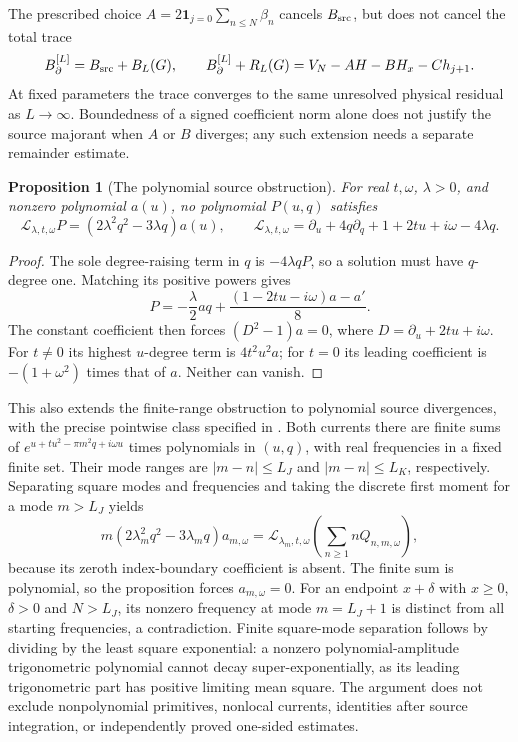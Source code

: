 \documentclass[11pt]{article}
\numberwithin{equation}{section}
\newtheorem{proposition}[theorem]{Proposition}
\theoremstyle{definition}
\theoremstyle{remark}
\begin{document}
The prescribed choice
$A=2\mathbf1_{j=0}\sum_{n\le N}\beta_n$ cancels $B_{\rm src}$,
but does not cancel the total trace
\begin{equation}
 B_\partial^{[L]}=B_{\rm src}+B_L(G),\qquad
 B_\partial^{[L]}+R_L(G)=V_N-AH-BH_x-Ch_{j+1}.
 \label{adj:joint-total-residual}
\end{equation}
At fixed parameters the trace converges to the same unresolved physical
residual as $L\to\infty$. Boundedness of a signed coefficient norm
alone does not justify the source majorant when $A$ or $B$ diverges;
any such extension needs a separate remainder estimate.

\begin{proposition}[The polynomial source obstruction]
\label{adj:polynomial-source-obstruction}
For real $t,\omega$, $\lambda>0$, and nonzero polynomial $a(u)$,
no polynomial $P(u,q)$ satisfies
\begin{equation}
 \mathcal L_{\lambda,t,\omega}P
 =(2\lambda^2q^2-3\lambda q)a(u),\qquad
 \mathcal L_{\lambda,t,\omega}
 =\partial_u+4q\partial_q+1+2tu+i\omega-4\lambda q.
 \label{adj:polynomial-source-equation}
\end{equation}
\end{proposition}
\begin{proof}
The sole degree-raising term in $q$ is $-4\lambda qP$, so a
solution must have $q$-degree one. Matching its positive powers gives
\[
 P=-\frac\lambda2a q+\frac{(1-2tu-i\omega)a-a'}8.
\]
The constant coefficient then forces $(D^2-1)a=0$, where
$D=\partial_u+2tu+i\omega$.
For $t\ne0$ its highest $u$-degree term is $4t^2u^2a$;
for $t=0$ its leading coefficient is $-(1+\omega^2)$ times that
of $a$. Neither can vanish.
\end{proof}

This also extends the finite-range obstruction to polynomial source
divergences, with the precise pointwise class specified in
\cite{ThetaJointCurrent}. Both currents there are finite sums of
$e^{u+tu^2-\pi m^2q+i\omega u}$ times polynomials in $(u,q)$,
with real frequencies in a fixed finite set. Their mode ranges are
$|m-n|\le L_J$ and $|m-n|\le L_K$, respectively.
Separating square modes and frequencies and taking the discrete first
moment for a mode $m>L_J$ yields
\[
 m(2\lambda_m^2q^2-3\lambda_mq)a_{m,\omega}
 =\mathcal L_{\lambda_m,t,\omega}
       \left(\sum_{n\ge1}nQ_{n,m,\omega}\right),
\]
because its zeroth index-boundary coefficient is absent.
The finite sum is polynomial, so the proposition forces
$a_{m,\omega}=0$. For an endpoint $x+\delta$ with $x\ge0$,
$\delta>0$ and $N>L_J$, its nonzero frequency at mode
$m=L_J+1$ is distinct from all starting frequencies, a contradiction.
Finite square-mode separation follows by dividing by the least square
exponential: a nonzero polynomial-amplitude trigonometric polynomial
cannot decay super-exponentially, as its leading trigonometric part
has positive limiting mean square. The argument does not exclude
nonpolynomial primitives, nonlocal currents, identities after source
integration, or independently proved one-sided estimates.
\end{document}
